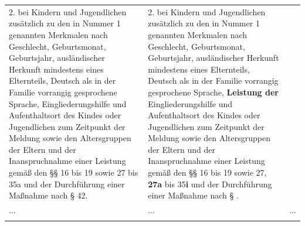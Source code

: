 \documentclass[10pt,a4paper,landscape]{article}
\begin{document}
\begin{longtable}{|L{8.2cm}|L{8.2cm}|L{8.2cm}|}
2.   \newline bei Kindern und Jugendlichen zusätzlich zu  \newline den in Nummer 1 genannten Merkmalen  \newline nach Geschlecht, Geburtsmonat,  \newline Geburtsjahr, ausländischer Herkunft  \newline mindestens eines Elternteils, Deutsch als in  \newline der Familie vorrangig gesprochene  \newline Sprache, Eingliederungshilfe und  \newline Aufenthaltsort des Kindes oder  \newline Jugendlichen zum Zeitpunkt der Meldung  \newline sowie den Altersgruppen der Eltern und der  \newline Inanspruchnahme einer Leistung gemäß  \newline den \S{}\S{} 16 bis 19 sowie 27 bis 35a und der  \newline Durchführung einer Maßnahme nach \S{} 42. & 2.   \newline bei Kindern und Jugendlichen zusätzlich zu  \newline den in Nummer 1 genannten Merkmalen  \newline nach Geschlecht, Geburtsmonat,  \newline Geburtsjahr, ausländischer Herkunft  \newline mindestens eines Elternteils, Deutsch als in  \newline der Familie vorrangig gesprochene  \newline Sprache, \textbf{\textcolor{diffred}{Leistung der}} Eingliederungshilfe  \newline und Aufenthaltsort des Kindes oder  \newline Jugendlichen zum Zeitpunkt der Meldung  \newline sowie den Altersgruppen der Eltern und der  \newline Inanspruchnahme einer Leistung gemäß  \newline den \S{}\S{} 16 bis 19 sowie 27, \textbf{\textcolor{diffred}{27a}} bis 35\textbf{\textcolor{diffred}{i}} und  \newline der Durchführung einer Maßnahme nach \S{}  . &  \\
\hhline{|---|}
... & ... & ... \\
\hhline{|---|}

\end{longtable}
\end{document}
